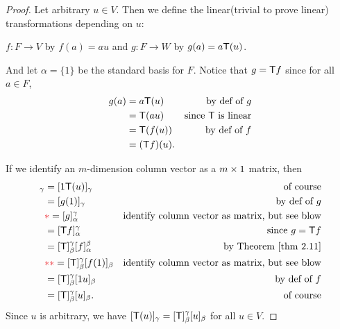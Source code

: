 \begin{proof}
Let arbitrary \(u \in V\).
Then we define the linear(trivial to prove linear) transformations depending on \(u\):
\begin{center}
    \(f : F \to V\) by \(f(a) = au\) and \(g : F \to W\) by \(g(a) = a\textsf{T}(u)\).
\end{center}
And let \(\alpha = \{ 1 \}\) be the standard basis for \(F\).
Notice that \(g = \textsf{T} f\) since for all \(a \in F\),
\begin{align*}
    g(a) & = a\textsf{T}(u) & \text{by def of \(g\)} \\
         & = \textsf{T}(au) & \text{since \(\textsf{T}\) is linear} \\
         & = \textsf{T}(f(u)) & \text{by def of \(f\)} \\
         & = (\textsf{T} f)(u).
\end{align*}

If we identify an \(m\)-dimension column vector as a \(m \times 1\) matrix, then
\begin{align*}
    [\T(u)]_{\gamma} & = [1\T(u)]_{\gamma} & \text{of course} \\
                     & = [g(1)]_{\gamma} & \text{by def of \(g\)} \\
                     & \RED{*}= [g]_{\alpha}^{\gamma} & \text{identify column vector as matrix, but see blow} \\
                     & = [\T f]_{\alpha}^{\gamma} & \text{since \(g = \T f\)} \\
                     & = [\T]_{\beta}^{\gamma} [f]_{\alpha}^{\beta} & \text{by \THM{2.11}} \\
                     & \RED{**}= [\T]_{\beta}^{\gamma} [f(1)]_{\beta} & \text{identify column vector as matrix, but see blow}\\
                     & = [\T]_{\beta}^{\gamma} [1u]_{\beta} & \text{by def of \(f\)} \\
                     & = [\T]_{\beta}^{\gamma}[u]_{\beta}. & \text{of course}
\end{align*}
Since \(u\) is arbitrary, we have \([\textsf{T}(u)]_{\gamma} = [\textsf{T}]_{\beta}^{\gamma}[u]_{\beta}\) for all \(u \in V\).


\end{proof}
